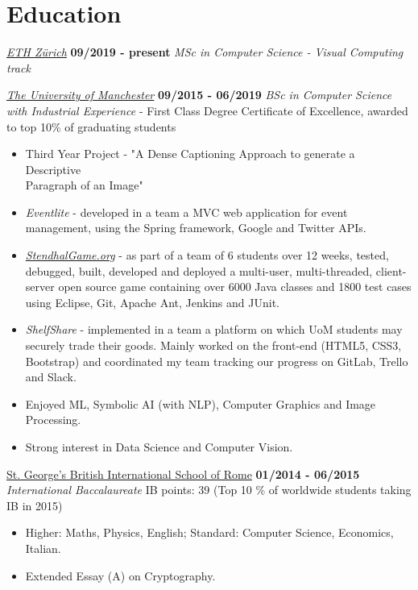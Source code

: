 \documentclass[]{friggeri-cv}
\begin{document}
\section{\color{red}Education}
\begin{entrylist}
    \entry
    {}
    {\emph{\href{https://inf.ethz.ch/studies/master/master-cs.html}{ETH Zürich}}}
    {\textbf{09/2019 - present}}
    {\emph{MSc in Computer Science - Visual Computing track}}

  \entry
    {}
    {\emph{\href{http://www.manchester.ac.uk/}{The University of Manchester}}}
    {\textbf{09/2015 - 06/2019}}
    {\emph{BSc in Computer Science with Industrial Experience} - First Class Degree}
    {Certificate of Excellence, awarded to top 10\% of graduating students}
    \begin{itemize}
        \item Third Year Project - "A Dense Captioning Approach to generate a Descriptive \\Paragraph of an Image"
        \item \emph{Eventlite} - developed in a team a MVC web application for event management, using the Spring framework, Google and Twitter APIs.
        \item \emph{\href{https://stendhalgame.org/}{StendhalGame.org}} - as part of a team of 6 students over 12 weeks, tested, debugged, built, developed and deployed a multi-user, multi-threaded, client-server open source game containing over 6000 Java classes and 1800 test cases using Eclipse, Git, Apache Ant, Jenkins and JUnit.
        \item \emph{ShelfShare} - implemented in a team a platform on which UoM students may securely trade their goods. Mainly worked on the front-end (HTML5, CSS3, Bootstrap) and coordinated my team tracking our progress on GitLab, Trello and Slack.
        \item Enjoyed ML, Symbolic AI (with NLP), Computer Graphics and Image Processing.
        \item Strong interest in Data Science and Computer Vision.
    \end{itemize}
  \entry
    {}
    {\href{http://www.stgeorge.school.it/}{St. George's British International School of Rome}}
    {\textbf{01/2014 - 06/2015}}
    {\emph{International Baccalaureate}}
    {IB points: 39  (Top 10 \% of worldwide students taking IB in 2015)}
    \begin{itemize}
        \item Higher: Maths, Physics, English; Standard: Computer Science, Economics, Italian.
        \item Extended Essay (A) on Cryptography.
    \end{itemize}
\end{entrylist}
\end{document}
